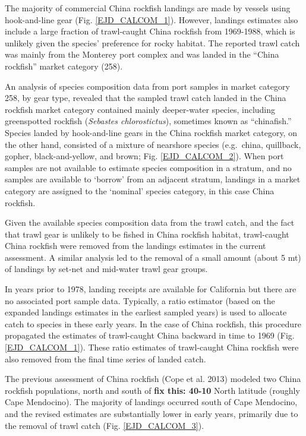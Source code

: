 \documentclass[12pt,]{article}
\begin{document}
The majority of commercial China rockfish landings are made by vessels
using hook-and-line gear (Fig. \ref{EJD_CALCOM_1}). However, landings
estimates also include a large fraction of trawl-caught China rockfish
from 1969-1988, which is unlikely given the species' preference for
rocky habitat. The reported trawl catch was mainly from the Monterey
port complex and was landed in the ``China rockfish'' market category
(258).

An analysis of species composition data from port samples in market
category 258, by gear type, revealed that the sampled trawl catch landed
in the China rockfish market category contained mainly deeper-water
species, including greenspotted rockfish (\emph{Sebastes
chlorostictus}), sometimes known as ``chinafish.'' Species landed by
hook-and-line gears in the China rockfish market category, on the other
hand, consisted of a mixture of nearshore species (e.g.~china,
quillback, gopher, black-and-yellow, and brown; Fig.
\ref{EJD_CALCOM_2}). When port samples are not available to estimate
species composition in a stratum, and no samples are available to
`borrow' from an adjacent stratum, landings in a market category are
assigned to the `nominal' species category, in this case China rockfish.

Given the available species composition data from the trawl catch, and
the fact that trawl gear is unlikely to be fished in China rockfish
habitat, trawl-caught China rockfish were removed from the landings
estimates in the current assessment. A similar analysis led to the
removal of a small amount (about 5 mt) of landings by set-net and
mid-water trawl gear groups.

In years prior to 1978, landing receipts are available for California
but there are no associated port sample data. Typically, a ratio
estimator (based on the expanded landings estimates in the earliest
sampled years) is used to allocate catch to species in these early
years. In the case of China rockfish, this procedure propagated the
estimates of trawl-caught China backward in time to 1969 (Fig.
\ref{EJD_CALCOM_1}). These ratio estimates of trawl-caught China
rockfish were also removed from the final time series of landed catch.

The previous assessment of China rockfish (Cope et al. 2013) modeled two
China rockfish populations, north and south of \textbf{fix this: 40-10}
North latitude (roughly Cape Mendocino). The majority of landings
occurred south of Cape Mendocino, and the revised estimates are
substantially lower in early years, primarily due to the removal of
trawl catch (Fig. \ref{EJD_CALCOM_3}).
\end{document}
